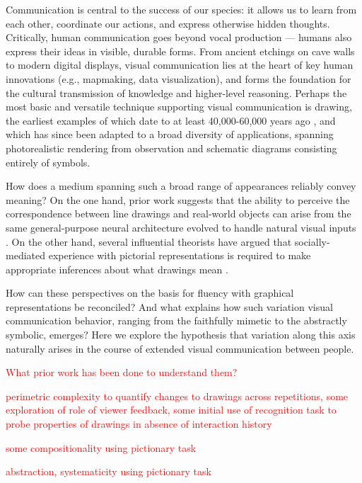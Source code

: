 \documentclass[10pt,letterpaper]{article}
\newcommand{\red}[1]{\textcolor{Red}{#1}}
\begin{document}
Communication is central to the success of our species: it allows us to learn from each other, coordinate our actions, and express otherwise hidden thoughts. 
Critically, human communication goes beyond vocal production --- humans also express their ideas in visible, durable forms. 
From ancient etchings on cave walls to modern digital displays, visual communication lies at the heart of key human innovations (e.g., mapmaking, data visualization), and forms the foundation for the cultural transmission of knowledge and higher-level reasoning. 
Perhaps the most basic and versatile technique supporting visual communication is drawing, the earliest examples of which date to at least 40,000-60,000 years ago \cite{hoffmann2018u,Aubert:2014jy}, and which has since been adapted to a broad diversity of applications, spanning photorealistic rendering from observation and schematic diagrams consisting entirely of symbols. 

How does a medium spanning such a broad range of appearances reliably convey meaning? 
On the one hand, prior work suggests that the ability to perceive the correspondence between line drawings and real-world objects can arise from the same general-purpose neural architecture evolved to handle natural visual inputs \cite{FanCommon2018,sayim2011line}. 
On the other hand, several influential theorists have argued that socially-mediated experience with pictorial representations is required to make appropriate inferences about what drawings mean \cite{goodman1976languages,gombrich1969art}.

How can these perspectives on the basis for fluency with graphical representations be reconciled? 
And what explains how such variation visual communication behavior, ranging from the faithfully mimetic to the abstractly symbolic, emerges? 
Here we explore the hypothesis that variation along this axis naturally arises in the course of extended visual communication between people. 


\red{What prior work has been done to understand them?}


\red{perimetric complexity to quantify changes to drawings across repetitions, some exploration of role of viewer feedback, some initial use of recognition task to probe properties of drawings in absence of interaction history}
\cite{garrod_foundations_2007}

\red{some compositionality using pictionary task}
\cite{theisen2010systematicity}

\red{abstraction, systematicity using pictionary task}
\cite{healey2007graphical}
\end{document}
